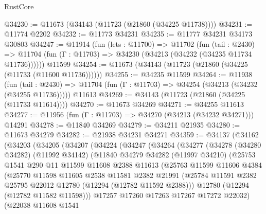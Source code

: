 \begin{lexlean}{RustCore}
\begin{coremodule}
@34230 := @11673 (@34143 (@11723 (@21860 (@34225 @11738))))
@34231 := @11774 @2202
@34232 := @11773 @34231
@34235 := @11777 @34231 @34173 @30803
@34247 := @11914
    (fun (lets : @11700) =>
    @11702
      (fun (tail : @2430) =>
      @11704 (fun (Γ : @11703) => @34230 (@34213 (@34232 (@34235 @11734 @11736))))))
    @11599
@34254 := @11673 (@34143 (@11723 (@21860 (@34225 (@11733 (@11600 @11736))))))
@34255 := @34235 @11599
@34264 := @11938
    (fun (tail : @2430) => @11704 (fun (Γ : @11703) => @34254 (@34213 (@34232 (@34255 @11736)))))
    @11613
@34269 := @34143 (@11723 (@21860 (@34225 (@11733 @11614))))
@34270 := @11673 @34269
@34271 := @34255 @11613
@34277 := @11956 (fun (Γ : @11703) => @34270 (@34213 (@34232 @34271))) @14291
@34278 := @11840 @34269
@34279 := @34211 @21935
@34280 := @11673 @34279
@34282 := @21938 @34231 @34271
@34359 := @34137
    (@34162
      (@34203
        (@34205
          (@34207
            (@34224
              (@34247
                (@34264
                  (@34277
                    (@34278
                      (@34280 @34282)
                      (@11992 @34142)
                      (@11840
                        @34279
                        @34282
                        (@11997 @34210)
                        (@25753
                          @1541
                          @290
                          @11
                          @11599
                          @11608
                          @2388
                          @11613
                          (@25763
                            @11599
                            @11606
                            @4384
                            (@25770
                              @11598
                              @11605
                              @2538
                              @11581
                              @2382
                              @21991
                              (@25784
                                @11591
                                @2382
                                @25795
                                @22012
                                @12780
                                (@12294 (@12782 @11592 @2388)))
                              @12780
                              (@12294 (@12782 @11582 @11598)))
                            @17257
                            @17260
                            @17263
                            @17267
                            @17272
                            @22032)
                          (@22038
                            @11608
                            @1541

\end{coremodule}
\end{lexlean}
